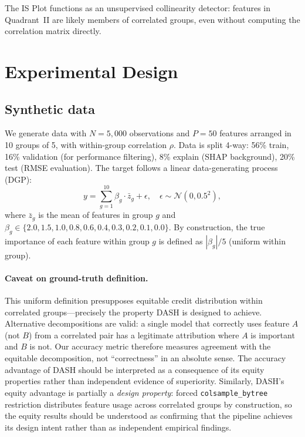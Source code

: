 \documentclass[11pt]{article}
\newcommand{\dash}{\textsc{DASH}}
\newcommand{\rhovar}{\rho}
\begin{document}
The IS Plot functions as an unsupervised collinearity detector: features
in Quadrant~II are likely members of correlated groups, even without
computing the correlation matrix directly.


\section{Experimental Design}
\label{sec:experiments}

\subsection{Synthetic data}

We generate data with $N = 5{,}000$ observations and $P = 50$ features
arranged in 10 groups of 5, with within-group correlation $\rhovar$.
Data is split 4-way: 56\% train, 16\% validation (for performance
filtering), 8\% explain (SHAP background), 20\% test (RMSE evaluation).
The target follows a linear data-generating process (DGP):
\begin{equation}
  y = \sum_{g=1}^{10} \beta_g \cdot \bar{z}_g + \epsilon,
  \quad \epsilon \sim \mathcal{N}(0, 0.5^2),
\end{equation}
where $\bar{z}_g$ is the mean of features in group $g$ and
$\beta_g \in \{2.0, 1.5, 1.0, 0.8, 0.6, 0.4, 0.3, 0.2, 0.1, 0.0\}$.
By construction, the true importance of each feature within group $g$ is
defined as $|\beta_g|/5$ (uniform within group).

\paragraph{Caveat on ground-truth definition.}
This uniform definition presupposes equitable credit distribution
within correlated groups---precisely the property \dash{} is designed
to achieve. Alternative decompositions are valid: a single model that
correctly uses feature $A$ (not $B$) from a correlated pair has a
legitimate attribution where $A$ is important and $B$ is not. Our
accuracy metric therefore measures agreement with the equitable
decomposition, not ``correctness'' in an absolute sense. The accuracy
advantage of \dash{} should be interpreted as a consequence of its
equity properties rather than independent evidence of superiority.
Similarly, \dash{}'s equity advantage is partially a \emph{design
property}: forced \texttt{colsample\_bytree} restriction distributes
feature usage across correlated groups by construction, so the equity
results should be understood as confirming that the pipeline achieves
its design intent rather than as independent empirical findings.
\end{document}
